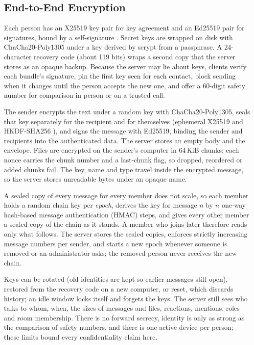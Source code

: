\documentclass[graybox]{svmult}
\begin{document}
\subsection{End-to-End Encryption}
\label{sec:e2ee}

 Each person has an X25519 key pair for key agreement and an Ed25519 pair for signatures, bound by a self-signature \cite{rfc7748,rfc8032}. Secret keys are wrapped on disk with ChaCha20-Poly1305 \cite{rfc8439} under a key derived by scrypt \cite{rfc7914} from a passphrase. A 24-character recovery code (about 119 bits) wraps a second copy that the server stores as an opaque backup. Because the server may lie about keys, clients verify each bundle's signature, pin the first key seen for each contact, block sending when it changes until the person accepts the new one, and offer a 60-digit safety number for comparison in person or on a trusted call.

 The sender encrypts the text under a random key with ChaCha20-Poly1305, seals that key separately for the recipient and for themselves (ephemeral X25519 and HKDF-SHA256 \cite{rfc5869}), and signs the message with Ed25519, binding the sender and recipients into the authenticated data. The server stores an empty body and the envelope. Files are encrypted on the sender's computer in 64\,KiB chunks; each nonce carries the chunk number and a last-chunk flag, so dropped, reordered or added chunks fail. The key, name and type travel inside the encrypted message, so the server stores unreadable bytes under an opaque name.

 A sealed copy of every message for every member does not scale, so each member holds a random chain key per \emph{epoch}, derives the key for message $n$ by $n$ one-way hash-based message authentication (HMAC) steps, and gives every other member a sealed copy of the chain as it stands. A member who joins later therefore reads only what follows. The server stores the sealed copies, enforces strictly increasing message numbers per sender, and starts a new epoch whenever someone is removed or an administrator asks; the removed person never receives the new chain.

 Keys can be rotated (old identities are kept so earlier messages still open), restored from the recovery code on a new computer, or reset, which discards history; an idle window locks itself and forgets the keys. The server still sees who talks to whom, when, the sizes of messages and files, reactions, mentions, roles and room membership. There is no forward secrecy, identity is only as strong as the comparison of safety numbers, and there is one active device per person; these limits bound every confidentiality claim here.
\end{document}
